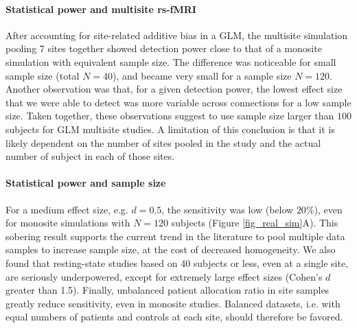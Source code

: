 \documentclass[authoryear]{elsarticle}
\begin{document}
\paragraph{Statistical power and multisite rs-fMRI} After accounting for site-related additive bias in a GLM, the multisite simulation pooling 7 sites together showed detection power close to that of a monosite simulation with equivalent sample size. The difference was noticeable for small sample size (total $N=40$), and became very small for a sample size $N=120$. Another observation was that, for a given detection power, the lowest effect size that we were able to detect was more variable across connections for a low sample size. Taken together, these observations suggest to use sample size larger than $100$ subjects for GLM multisite studies. A limitation of this conclusion is that it is likely dependent on the number of sites pooled in the study and the actual number of subject in each of those sites. 

\paragraph{Statistical power and sample size} For a medium effect size, e.g. $d=0.5$, the sensitivity was low (below $20\%$), even for monosite simulations with $N=120$ subjects (Figure \ref{fig_real_sim}A). This sobering result supports the current trend in the literature to pool multiple data samples to increase sample size, at the cost of decreased homogeneity. We also found that resting-state studies based on 40 subjects or less, even at a single site, are seriously underpowered, except for extremely large effect sizes (Cohen's $d$ greater than 1.5). Finally, unbalanced patient allocation ratio in site samples greatly reduce sensitivity, even in monosite studies. Balanced datasets, i.e. with equal numbers of patients and controls at each site, should therefore be favored. 
\end{document}

